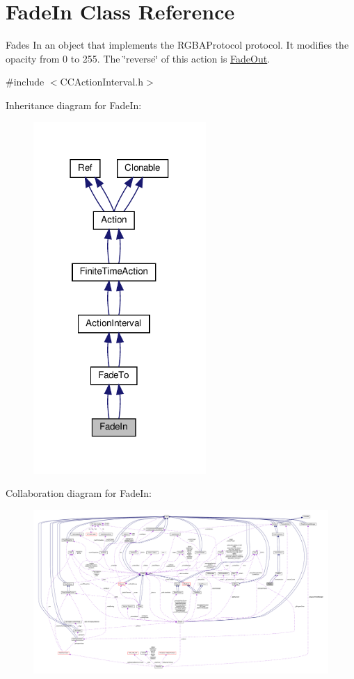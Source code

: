 \hypertarget{classFadeIn}{}\section{Fade\+In Class Reference}
\label{classFadeIn}


Fades In an object that implements the R\+G\+B\+A\+Protocol protocol. It modifies the opacity from 0 to 255. The \char`\"{}reverse\char`\"{} of this action is \hyperlink{classFadeOut}{Fade\+Out}.  




{\ttfamily \#include $<$C\+C\+Action\+Interval.\+h$>$}



Inheritance diagram for Fade\+In\+:
\nopagebreak
\begin{figure}[H]
\begin{center}
\leavevmode
\includegraphics[width=186pt]{classFadeIn__inherit__graph}
\end{center}
\end{figure}


Collaboration diagram for Fade\+In\+:
\nopagebreak
\begin{figure}[H]
\begin{center}
\leavevmode
\includegraphics[width=350pt]{classFadeIn__coll__graph}
\end{center}
\end{figure}
